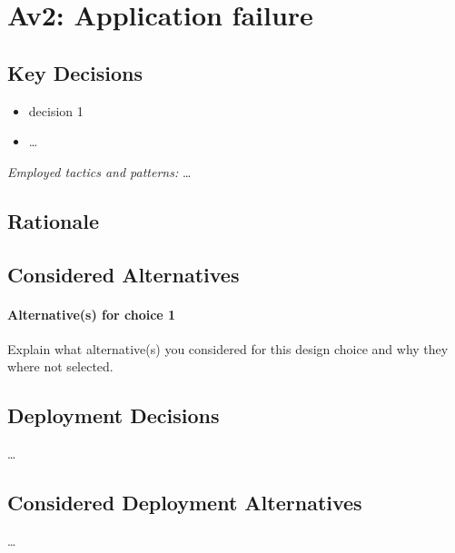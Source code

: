 \section{Av2: Application failure}
    \subsection*{Key Decisions}
    \begin{itemize}
    	\item decision 1
    	\item \ldots
    \end{itemize}
    \emph{Employed tactics and patterns:} \ldots

    \subsection*{Rationale}

    \subsection*{Considered Alternatives}
    \paragraph{Alternative(s) for choice 1} Explain what alternative(s) you
    considered for this design choice and why they where not selected.

    \subsection*{Deployment Decisions}
    \ldots

    \subsection*{Considered Deployment Alternatives}
    \ldots

